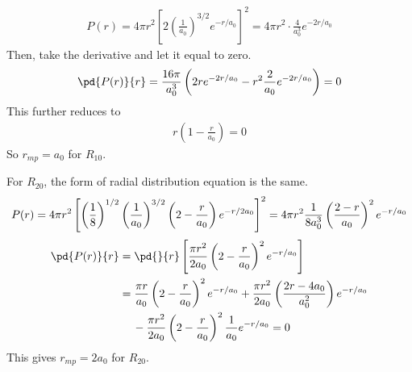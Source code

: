 \begin{solution}
\begin{enumerate}
\begin{align*}
                  P(r)=4\pi r^{2}\left[2\left(\frac{1}{a_{0}}\right)^{3/2}e^{-r/a_{0}}\right]^{2}=4\pi r^{2}\cdot\frac{4}{a_{0}^{3}}e^{-2r/a_{0}}
              \end{align*}
              Then, take the derivative and let it equal to zero.
              \begin{align*}
                  \pd{P(r)}{r}=\frac{16\pi}{a_{0}^{3}}\left(2re^{-2r/a_{0}}-r^{2}\frac{2}{a_{0}}e^{-2r/a_{0}}\right)=0
              \end{align*}
              This further reduces to
              \begin{align*}
                  r\left(1-\frac{r}{a_0}\right)=0
              \end{align*}
              So $r_{mp}=a_0$ for $R_{10}$.

              For $R_{20}$, the form of radial distribution equation is the same.
              \begin{equation*}
                  P(r)=4\pi r^{2}\left[\left(\frac{1}{8}\right)^{1/2}\left(\frac{1}{a_{0}}\right)^{3/2}\left(2-\frac{r}{a_{0}}\right)
                  e^{-r/2a_{0}}\right]^{2}=4\pi r^{2}\frac{1}{8a_{0}^{3}}\left(\frac{2-r}{a_{0}}\right)^{2} e^{-r / a_{0}} \\
              \end{equation*}
              \begin{align*}
                  \pd{P(r)}{r} & =\pd{}{r}\left[\frac{\pi r^{2}}{2 a_{0}}\left(2-\frac{r}{a_{0}}\right)^{2}e^{-r/a_{0}}\right]             \\
                               & =\frac{\pi r}{a_{0}}\left(2-\frac{r}{a_{0}}\right)^{2}e^{-r/a_{0}}+\frac{\pi r^{2}}{2a_{0}}
                  \left(\frac{2r-4a_{0}}{a_{0}^{2}}\right)e^{-r/a_0}                                                                       \\
                               & \hspace{12pt}-\frac{\pi r^{2}}{2 a_{0}}\left(2-\frac{r}{a_{0}}\right)^{2}\frac{1}{a_{0}} e^{-r / a_{0}}=0
              \end{align*}
              This gives $r_{mp}=2a_0$ for $R_{20}$.


\end{enumerate}
\end{solution}
